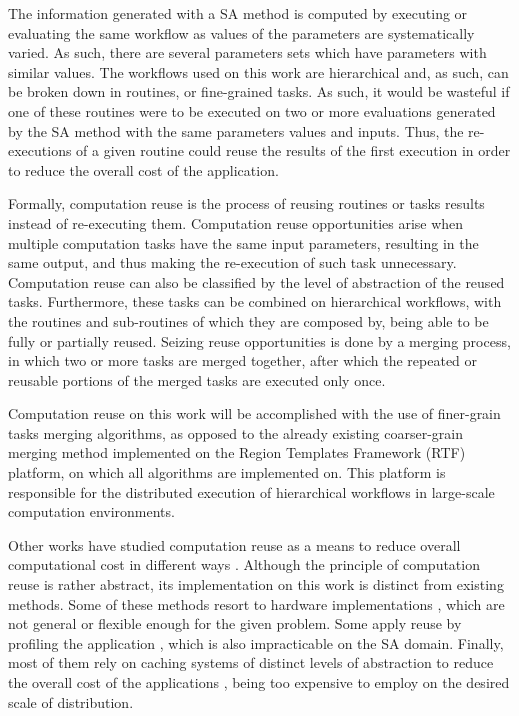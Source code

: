 The information generated with a SA method is computed by executing or evaluating the same workflow as values of the parameters are systematically varied. As such, there are several parameters sets which have parameters with similar values. The workflows used on this work are hierarchical and, as such, can be broken down in routines, or fine-grained tasks. As such, it would be wasteful if one of these routines were to be executed on two or more evaluations generated by the SA method with the same parameters values and inputs. Thus, the re-executions of a given routine could reuse the results of the first execution in order to reduce the overall cost of the application.

Formally, computation reuse is the process of reusing routines or tasks results instead of re-executing them. Computation reuse opportunities arise when multiple computation tasks have the same input parameters, resulting in the same output, and thus making the re-execution of such task unnecessary. Computation reuse can also be classified by the level of abstraction of the reused tasks. Furthermore, these tasks can be combined on hierarchical workflows, with the routines and sub-routines of which they are composed by, being able to be fully or partially reused. Seizing reuse opportunities is done by a merging process, in which two or more tasks are merged together, after which the repeated or reusable portions of the merged tasks are executed only once.

Computation reuse on this work will be accomplished with the use of finer-grain tasks merging algorithms, as opposed to the already existing coarser-grain merging method implemented on the  Region Templates Framework (RTF) platform, on which all algorithms are implemented on. This platform is responsible for the distributed execution of hierarchical workflows in large-scale computation environments.


Other works have studied computation reuse as a means to reduce overall computational cost in different ways \cite{reuse1,reuse2,reuse3,reuse4,reuse5,reuse6,reuse7,reuse8}. Although the principle of computation reuse is rather abstract, its implementation on this work is distinct from existing methods. Some of these methods resort to hardware implementations \cite{reuse2,reuse3}, which are not general or flexible enough for the given problem. Some apply reuse by profiling the application \cite{reuse4}, which is also impracticable on the SA domain. Finally, most of them rely on caching systems of distinct levels of abstraction to reduce the overall cost of the applications \cite{reuse5,reuse6,reuse7,reuse8}, being too expensive to employ on the desired scale of distribution. 

